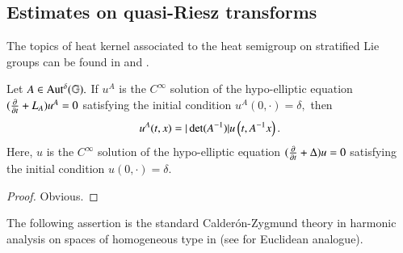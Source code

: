 \documentclass[leqno]{amsart}
\begin{document}
	
	
	
	
	
	
	
	\subsection{Estimates on quasi-Riesz transforms}\label{Estimates on quasi-Riesz transforms}
	
	
	
	
	The topics of heat kernel associated to the heat semigroup on stratified Lie groups can be found in \cite[IV.4]{VSC1992} and \cite[Chapter 1. G]{FS1982}.
	\begin{lemma}\label{heat-matrix}
		Let $A\in{\rm Aut^{\delta}}(\mathbb{G}).$ If $u^{A}$ is the $C^{\infty}$ solution of the hypo-elliptic equation $(\frac{\partial}{\partial t}+L_{A})u^A=0$ satisfying the initial condition $u^A(0,\cdot)=\delta,$ then
		\begin{align*}
			u^{A}(t,x)=|\det(A^{-1})|u\left(t,A^{-1} x\right).
		\end{align*}
		Here, $u$ is the $C^{\infty}$ solution of the hypo-elliptic equation $(\frac{\partial}{\partial t}+\Delta)u=0$ satisfying the initial condition $u(0,\cdot)=\delta.$
	\end{lemma}
	\begin{proof} Obvious.
		
	\end{proof}
	
	The following assertion is the standard Calder\'{o}n-Zygmund theory in harmonic analysis on spaces of homogeneous type in \cite[Chapter 1. Section 1.4]{DH-Book2009} (see \cite[Chapter 5]{G2014c} for Euclidean analogue).
	
\end{document}
